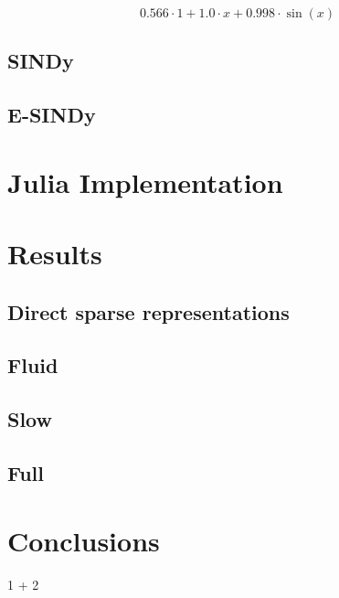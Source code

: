 \documentclass[
]{article}
\newenvironment{Shaded}{\begin{snugshade}}{\end{snugshade}}
\newcommand{\FloatTok}[1]{\textcolor[rgb]{0.68,0.00,0.00}{#1}}
\newcommand{\OperatorTok}[1]{\textcolor[rgb]{0.37,0.37,0.37}{#1}}
\begin{document}
\begin{equation} 0.566 \cdot 1 + 1.0 \cdot x + 0.998 \cdot \sin\left( x \right) \end{equation}

\subsection{SINDy}\label{sindy}

\subsection{E-SINDy}\label{e-sindy}

\section{Julia Implementation}\label{julia-implementation}

\section{Results}\label{results}

\subsection{Direct sparse
representations}\label{direct-sparse-representations}

\subsection{Fluid}\label{fluid}

\subsection{Slow}\label{slow}

\subsection{Full}\label{full}

\section{Conclusions}\label{conclusions}

\begin{Shaded}
\begin{Highlighting}[]
\FloatTok{1} \OperatorTok{+} \FloatTok{2}
\end{Highlighting}
\end{Shaded}
\end{document}
